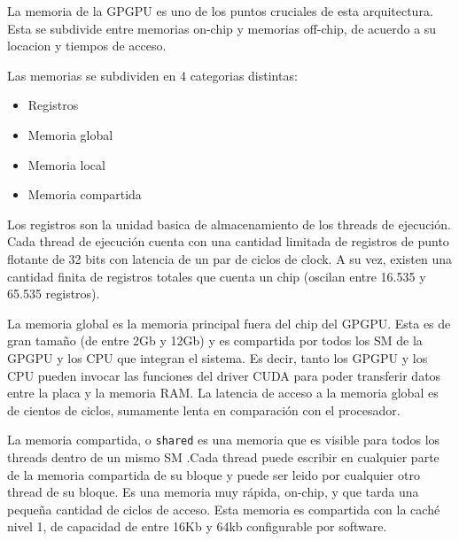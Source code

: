 %
%
La memoria de la GPGPU es uno de los puntos cruciales de esta arquitectura. Esta se subdivide
entre memorias on-chip y memorias off-chip, de acuerdo a su locacion y tiempos de acceso.

Las memorias se subdividen en 4 categorias distintas:

\begin{itemize}
  \item Registros
  \item Memoria global
  \item Memoria local
  \item Memoria compartida
\end{itemize}

Los registros son la unidad basica de almacenamiento de los threads de ejecuci\'on.
Cada thread de ejecuci\'on cuenta con una cantidad limitada de registros de punto flotante de
32 bits con latencia de un par de ciclos de clock. A su vez, existen una cantidad finita de
registros totales que cuenta un chip (oscilan entre 16.535 y 65.535 registros).

La memoria global es la memoria principal fuera del chip del GPGPU. Esta es de gran tama\~no (de
entre 2Gb y 12Gb) y es compartida por todos los SM de la GPGPU y los CPU que integran el
sistema. Es decir, tanto los GPGPU y los CPU pueden invocar las funciones del driver CUDA
para poder transferir datos entre la placa y la memoria RAM. La latencia de acceso a la memoria global
es de cientos de ciclos, sumamente lenta en comparaci\'on con el procesador.

La memoria compartida, o \texttt{shared} es una memoria que es visible para todos los threads dentro
de un mismo SM .Cada thread puede escribir en cualquier parte de la memoria compartida de su bloque y
puede ser leido por cualquier otro thread de su bloque. Es una memoria muy r\'apida, on-chip, y
que tarda una peque\~na cantidad de ciclos de acceso. Esta memoria es compartida con la cach\'e
nivel 1, de capacidad de entre 16Kb y 64kb configurable por software.

